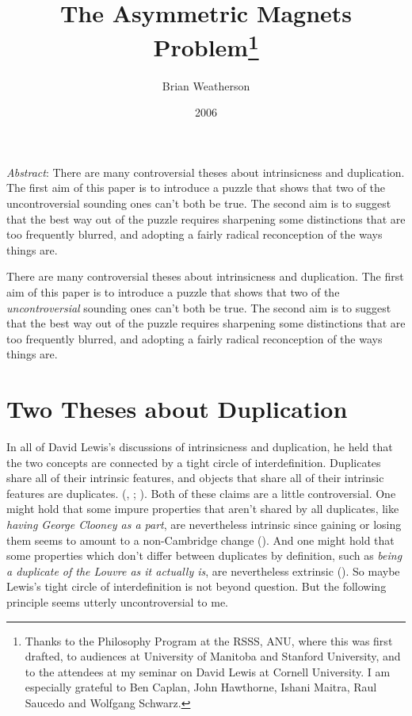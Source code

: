 \documentclass[
  11pt,
  letterpaper,
  DIV=11,
  numbers=noendperiod,
  twoside]{scrartcl}
\title{The Asymmetric Magnets Problem\thanks{Thanks to the Philosophy
Program at the RSSS, ANU, where this was first drafted, to audiences at
University of Manitoba and Stanford University, and to the attendees at
my seminar on David Lewis at Cornell University. I am especially
grateful to Ben Caplan, John Hawthorne, Ishani Maitra, Raul Saucedo and
Wolfgang Schwarz.}}
\author{Brian Weatherson}
\date{2006}
\renewenvironment{abstract}
 {\vspace{-1.25cm}
 \quotation\small\noindent\emph{Abstract}:}
 {\endquotation}
\begin{document}
\maketitle
\begin{abstract}
There are many controversial theses about intrinsicness and duplication.
The first aim of this paper is to introduce a puzzle that shows that two
of the uncontroversial sounding ones can't both be true. The second aim
is to suggest that the best way out of the puzzle requires sharpening
some distinctions that are too frequently blurred, and adopting a fairly
radical reconception of the ways things are.
\end{abstract}


There are many controversial theses about intrinsicness and duplication.
The first aim of this paper is to introduce a puzzle that shows that two
of the \emph{uncontroversial} sounding ones can't both be true. The
second aim is to suggest that the best way out of the puzzle requires
sharpening some distinctions that are too frequently blurred, and
adopting a fairly radical reconception of the ways things are.

\section{Two Theses about
Duplication}\label{two-theses-about-duplication}

In all of David Lewis's discussions of intrinsicness and duplication, he
held that the two concepts are connected by a tight circle of
interdefinition. Duplicates share all of their intrinsic features, and
objects that share all of their intrinsic features are duplicates.
(,
;
). Both of these
claims are a little controversial. One might hold that some impure
properties that aren't shared by all duplicates, like \emph{having
George Clooney as a part}, are nevertheless intrinsic since gaining or
losing them seems to amount to a non-Cambridge change
(). And one might
hold that some properties which don't differ between duplicates by
definition, such as \emph{being a duplicate of the Louvre as it actually
is}, are nevertheless extrinsic (). So
maybe Lewis's tight circle of interdefinition is not beyond question.
But the following principle seems utterly uncontroversial to me.
\end{document}

